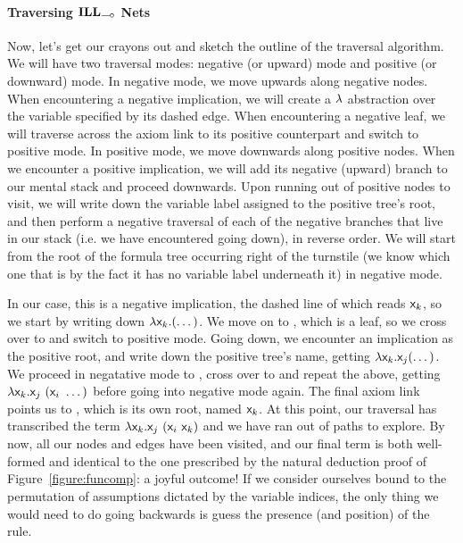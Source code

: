 \paragraph{Traversing $\ILL_{\li}$ Nets}
Now, let's get our crayons out and sketch the outline of the traversal algorithm.
We will have two traversal modes: negative (or upward) mode and positive (or downward) mode.
In negative mode, we move upwards along negative nodes.
When encountering a negative implication, we will create a $\mathnormal{\lambda}$ abstraction over the variable specified by its dashed edge.
When encountering a negative leaf, we will traverse across the axiom link to its positive counterpart and switch to positive mode.
In positive mode, we move downwards along positive nodes.
When we encounter a positive implication, we will add  its negative (upward) branch to our mental stack and proceed downwards.
Upon running out of positive nodes to visit, we will write down the variable label assigned to the positive tree's root, and then perform a negative traversal of each of the negative branches that live in our stack (i.e. we have encountered going down), in reverse order.
We will start from the root of the formula tree occurring right of the turnstile (we know which one that is by the fact it has no variable label underneath it) in negative mode.

In our case, this is a negative implication, the dashed line of which reads $\mathsf{\mathsf{x}_{\mathnormal{k}}}$, so we start by writing down $\mathsf{\mathnormal{\lambda} \mathsf{x}_{\mathnormal{k}}. (\dots)}$. 
We move on to , which is a leaf, so we cross over to  and switch to positive mode. Going down, we encounter an implication as the positive root, and write down the positive tree's name, getting $\mathsf{\mathnormal{\lambda} \mathsf{x}_{\mathnormal{k}}.\mathsf{x}_{\mathnormal{j}} (\dots)}$.
We proceed in negatative mode to , cross over to  and repeat the above, getting $\mathsf{\mathnormal{\lambda} \mathsf{x}_{\mathnormal{k}}.\mathsf{x}_{\mathnormal{j}}~(\mathsf{x}_{\mathnormal{i}}~\dots)}$ before going into negative mode again.
The final axiom link points us to , which is its own root, named $\mathsf{\mathsf{x}_{\mathnormal{k}}}$.
At this point, our traversal has transcribed the term $\mathsf{\mathnormal{\lambda} \mathsf{x}_{\mathnormal{k}}.\mathsf{x}_{\mathnormal{j}}~(\mathsf{x}_{\mathnormal{i}}~\mathsf{x}_{\mathnormal{k}})}$ and we have ran out of paths to explore.
By now, all our nodes and edges have been visited, and our final term is both well-formed and identical to the one prescribed by the natural deduction proof of Figure~\ref{figure:funcomp}: a joyful outcome!
If we consider ourselves bound to the permutation of assumptions dictated by the variable indices, the only thing we would need to do going backwards is guess the presence (and position) of the \Exchange{} rule.

